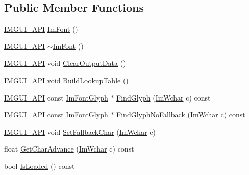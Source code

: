 \subsection*{Public Member Functions}
\begin{DoxyCompactItemize}
\item 
\mbox{\hyperlink{imgui_8h_a43829975e84e45d1149597467a14bbf5}{I\+M\+G\+U\+I\+\_\+\+A\+PI}} \mbox{\hyperlink{struct_im_font_a1d35b1eb7c2f6a3a648308531e88e7f1}{Im\+Font}} ()
\item 
\mbox{\hyperlink{imgui_8h_a43829975e84e45d1149597467a14bbf5}{I\+M\+G\+U\+I\+\_\+\+A\+PI}} \mbox{\hyperlink{struct_im_font_a377366ed7c5d076363ad4760aeff63ec}{$\sim$\+Im\+Font}} ()
\item 
\mbox{\hyperlink{imgui_8h_a43829975e84e45d1149597467a14bbf5}{I\+M\+G\+U\+I\+\_\+\+A\+PI}} void \mbox{\hyperlink{struct_im_font_aecf7773b1c40b433f91ee245f463de12}{Clear\+Output\+Data}} ()
\item 
\mbox{\hyperlink{imgui_8h_a43829975e84e45d1149597467a14bbf5}{I\+M\+G\+U\+I\+\_\+\+A\+PI}} void \mbox{\hyperlink{struct_im_font_a04b3a1437bd0032722bbbd3613941162}{Build\+Lookup\+Table}} ()
\item 
\mbox{\hyperlink{imgui_8h_a43829975e84e45d1149597467a14bbf5}{I\+M\+G\+U\+I\+\_\+\+A\+PI}} const \mbox{\hyperlink{struct_im_font_glyph}{Im\+Font\+Glyph}} $\ast$ \mbox{\hyperlink{struct_im_font_ac6a773b73c6406fd8f08c4c93213a501}{Find\+Glyph}} (\mbox{\hyperlink{imgui_8h_af2c7badaf05a0008e15ef76d40875e97}{Im\+Wchar}} c) const
\item 
\mbox{\hyperlink{imgui_8h_a43829975e84e45d1149597467a14bbf5}{I\+M\+G\+U\+I\+\_\+\+A\+PI}} const \mbox{\hyperlink{struct_im_font_glyph}{Im\+Font\+Glyph}} $\ast$ \mbox{\hyperlink{struct_im_font_aa9ce4765070dfdee66bf5e5e81acaac3}{Find\+Glyph\+No\+Fallback}} (\mbox{\hyperlink{imgui_8h_af2c7badaf05a0008e15ef76d40875e97}{Im\+Wchar}} c) const
\item 
\mbox{\hyperlink{imgui_8h_a43829975e84e45d1149597467a14bbf5}{I\+M\+G\+U\+I\+\_\+\+A\+PI}} void \mbox{\hyperlink{struct_im_font_a1f504f78cc066db20ea2d688e73a560b}{Set\+Fallback\+Char}} (\mbox{\hyperlink{imgui_8h_af2c7badaf05a0008e15ef76d40875e97}{Im\+Wchar}} c)
\item 
float \mbox{\hyperlink{struct_im_font_adffcff4e4e2d17455410bd4ba76b42e4}{Get\+Char\+Advance}} (\mbox{\hyperlink{imgui_8h_af2c7badaf05a0008e15ef76d40875e97}{Im\+Wchar}} c) const
\item 
bool \mbox{\hyperlink{struct_im_font_a97dafa61cc94e84be396d69b0d42b1ce}{Is\+Loaded}} () const

\end{DoxyCompactItemize}
